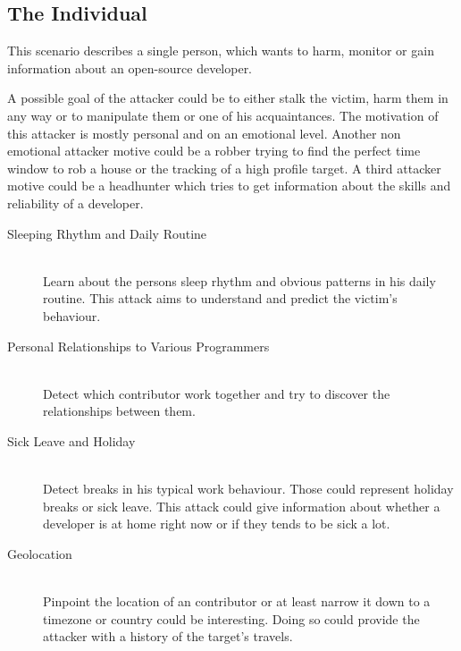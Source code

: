 \subsection{The Individual}
This scenario describes a single person, which wants to harm, monitor or gain information about an open-source developer.

A possible goal of the attacker could be to either stalk the victim, harm them in any way or to manipulate them or one of his acquaintances.
The motivation of this attacker is mostly personal and on an emotional level.
Another non emotional attacker motive could be a robber trying to find the perfect time window to rob a house or the tracking of a high profile target.
A third attacker motive could be a headhunter which tries to get information about the skills and reliability of a developer.

\begin{description}
    \item[Sleeping Rhythm and Daily Routine] \hfill \\
        Learn about the persons sleep rhythm and obvious patterns in his daily routine.
        This attack aims to understand and predict the victim's behaviour.

    \item[Personal Relationships to Various Programmers] \hfill \\
        Detect which contributor work together and try to discover the relationships between them.

    \item[Sick Leave and Holiday] \hfill \\
        Detect breaks in his typical work behaviour. Those could represent holiday breaks or sick leave.
        This attack could give information about whether a developer is at home right now or if they tends to be sick a lot.

    \item[Geolocation] \hfill \\
        Pinpoint the location of an contributor or at least narrow it down to a timezone or country could be interesting.
        Doing so could provide the attacker with a history of the target's travels.
\end{description}



